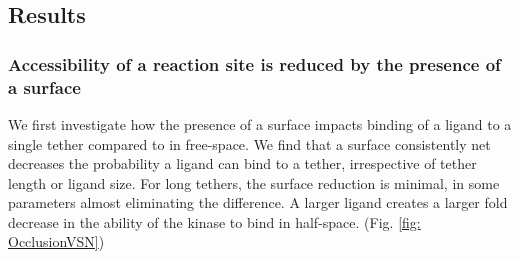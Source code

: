 \documentclass[../../AdvancementSummary.tex]{subfiles}
\begin{document}
%
%



\subsection{Results}

\subsubsection{Accessibility of a reaction site is reduced by the presence of a surface}

We first investigate how the presence of a surface impacts binding of a ligand to a single tether compared to in free-space. We find that a surface consistently net decreases the probability a ligand can bind to a tether, irrespective of tether length or ligand size. For long tethers, the surface reduction is minimal, in some parameters almost eliminating the difference. A larger ligand creates a larger fold decrease in the ability of the kinase to bind in half-space. (Fig. \ref{fig: OcclusionVSN})
\end{document}
